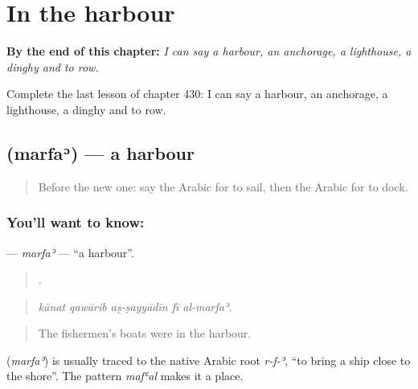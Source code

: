 
\chapter{In the harbour}
\label{ch:ar-in-the-harbour}

\begin{chapteropening}
\textbf{By the end of this chapter:} \emph{I can say a harbour, an anchorage, a lighthouse, a dinghy and to row.}

Complete the last lesson of chapter 430: I can say a harbour, an anchorage, a lighthouse, a dinghy and to row.
\end{chapteropening}

\section[\texorpdfstring{\ar{مرفأ} (marfaʾ)}{مرفأ (marfaʾ)}]{ (marfaʾ) — a harbour}

\label{lesson:AR-C430-marfa}



\begin{quote}
Before the new one: say the Arabic for to sail, then the Arabic for to dock.
\end{quote}

\subsection*{You'll want to know: }
\textbf{} — \emph{marfaʾ} — \textquotedblleft{}a harbour\textquotedblright{}.

\begin{quote}
    .
\end{quote}

\begin{quote}
\emph{kānat qawārib aṣ-ṣayyādīn fī al-marfaʾ.}
\end{quote}

\begin{quote}
The fishermen's boats were in the harbour.
\end{quote}

\begin{cousinweb}
\textbf{} (\emph{marfaʾ}) is usually traced to the native Arabic root \emph{r-f-ʾ}, \textquotedblleft{}to bring a ship close to the shore\textquotedblright{}. The pattern \emph{mafʿal} makes it a place.
\end{cousinweb}

